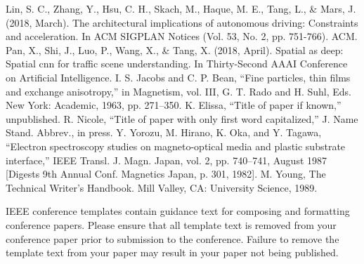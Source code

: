 \documentclass[conference]{IEEEtran}
\begin{document}
\begin{thebibliography}{00}
 Lin, S. C., Zhang, Y., Hsu, C. H., Skach, M., Haque, M. E., Tang, L., \& Mars, J. (2018, March). The architectural implications of autonomous driving: Constraints and acceleration. In ACM SIGPLAN Notices (Vol. 53, No. 2, pp. 751-766). ACM.
 Pan, X., Shi, J., Luo, P., Wang, X., \& Tang, X. (2018, April). Spatial as deep: Spatial cnn for traffic scene understanding. In Thirty-Second AAAI Conference on Artificial Intelligence.
 I. S. Jacobs and C. P. Bean, ``Fine particles, thin films and exchange anisotropy,'' in Magnetism, vol. III, G. T. Rado and H. Suhl, Eds. New York: Academic, 1963, pp. 271--350.
 K. Elissa, ``Title of paper if known,'' unpublished.
 R. Nicole, ``Title of paper with only first word capitalized,'' J. Name Stand. Abbrev., in press.
 Y. Yorozu, M. Hirano, K. Oka, and Y. Tagawa, ``Electron spectroscopy studies on magneto-optical media and plastic substrate interface,'' IEEE Transl. J. Magn. Japan, vol. 2, pp. 740--741, August 1987 [Digests 9th Annual Conf. Magnetics Japan, p. 301, 1982].
 M. Young, The Technical Writer's Handbook. Mill Valley, CA: University Science, 1989.
\end{thebibliography}
\vspace{12pt}
\color{red}
IEEE conference templates contain guidance text for composing and formatting conference papers. Please ensure that all template text is removed from your conference paper prior to submission to the conference. Failure to remove the template text from your paper may result in your paper not being published.
\end{document}
